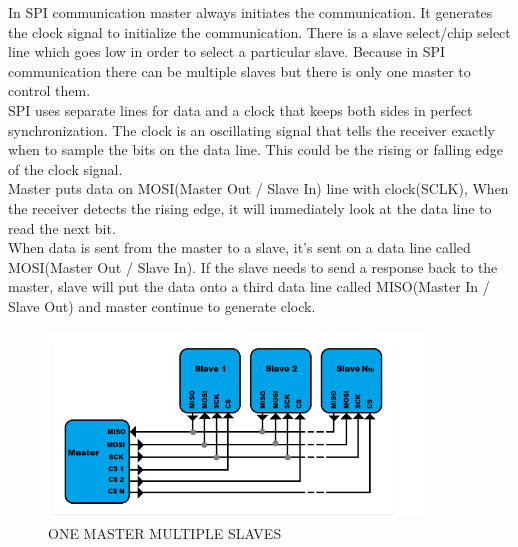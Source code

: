 \documentclass[11pt,a4paper]{book}
\begin{document}
	In SPI communication master always initiates the communication. It generates the clock signal to initialize the communication. There is a slave select/chip select line which goes low in order to select a particular slave. Because in SPI communication there can be multiple slaves but there is only one master to control them.\\
	SPI uses separate lines for data and a clock that keeps both sides in perfect synchronization. The clock is an oscillating signal that tells the receiver exactly when to sample the bits on the data line. This could be the rising  or falling edge of the clock signal.\\ 
	
	Master puts data on MOSI(Master Out / Slave In) line with clock(SCLK), When the receiver detects the rising edge, it will immediately look at the data line to read the next bit.\\ 
	
	When data is sent from the master to a slave, it’s sent on a data line called MOSI(Master Out / Slave In). If the slave needs to send a response back to the master,  slave will put the data onto a third data line called MISO(Master In / Slave Out) and master continue to generate clock. \begin{figure}[h]
		\centering
		\includegraphics[width=10cm,height=5cm]{multiplespi.PNG}
		\caption{ONE MASTER MULTIPLE SLAVES}
	\end{figure}
	\newpage
\end{document}
